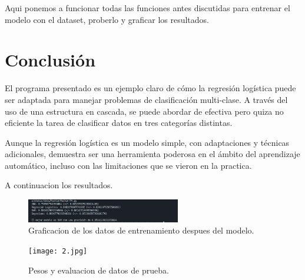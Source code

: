 \documentclass[12pt]{article}
\begin{document}
Aqui ponemos a funcionar todas las funciones antes discutidas para entrenar el modelo con el dataset, proberlo y graficar los resultados.

\clearpage
\section*{Conclusión}
El programa presentado es un ejemplo claro de cómo la regresión logística puede ser adaptada para manejar problemas de clasificación multi-clase. A través del uso de una estructura en cascada, se puede abordar de efectiva pero quiza no eficiente la tarea de clasificar datos en tres categorías distintas.

Aunque la regresión logística es un modelo simple, con adaptaciones y técnicas adicionales, demuestra ser una herramienta poderosa en el ámbito del aprendizaje automático, incluso con las limitaciones que se vieron en la practica. 

A continuacion los resultados.
\vspace{1cm}\vspace{1cm}
\begin{figure}[h] %
    \centering
    \includegraphics[width=0.6\textwidth]{1.jpg} %
    \caption{Graficacion de los datos de entrenamiento despues del modelo.} %
    \label{fig:1} %
\end{figure}
\vspace{1cm}\vspace{1cm}
\begin{figure}[h] %
    \centering
    \texttt{[image: 2.jpg]} %
    \caption{Pesos y evaluacion de datos de prueba.} %
    \label{fig:2} %
\end{figure}


\clearpage
\end{document}
